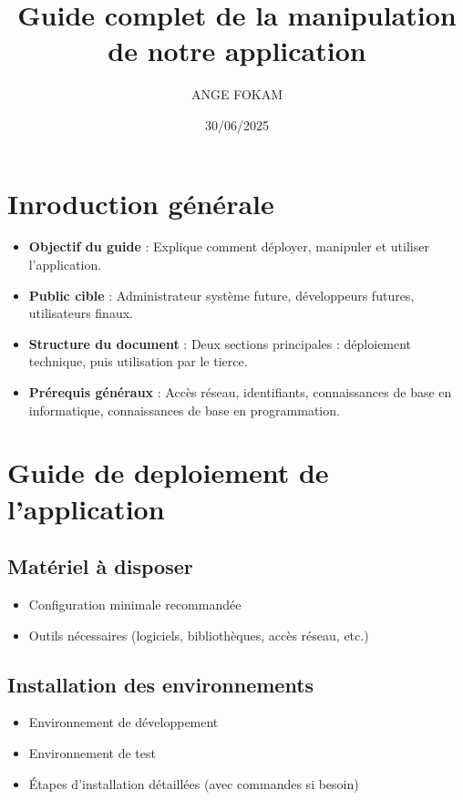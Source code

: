 \documentclass[12pt]{article}
\title{Guide complet de la manipulation de notre application}
\author{ANGE FOKAM}
\date{30/06/2025}
\begin{document}
    \maketitle
    \newpage
    \section*{Inroduction générale}
        \begin{itemize}[label=--]
            \item \textbf{Objectif du guide} : Explique comment déployer, manipuler et utiliser l'application.
            \item \textbf{Public cible} : Administrateur système future, développeurs futures, utilisateurs finaux.
            \item \textbf{Structure du document} : Deux sections principales : déploiement technique, puis utilisation par le tierce.
            \item \textbf{Prérequis généraux} : Accès réseau, identifiants, connaissances de base en informatique, connaissances de base en programmation.
        \end{itemize}
    \section{Guide de deploiement de l'application}
        \subsection{Matériel à disposer}
            \begin{itemize}[label=--]
                \item Configuration minimale recommandée
                \item Outils nécessaires (logiciels, bibliothèques, accès réseau, etc.)
            \end{itemize}
        \subsection{Installation des environnements}
            \begin{itemize}[label=--]
                \item Environnement de développement
                \item Environnement de test
                \item Étapes d’installation détaillées (avec commandes si besoin)
            \end{itemize}
\end{document}
